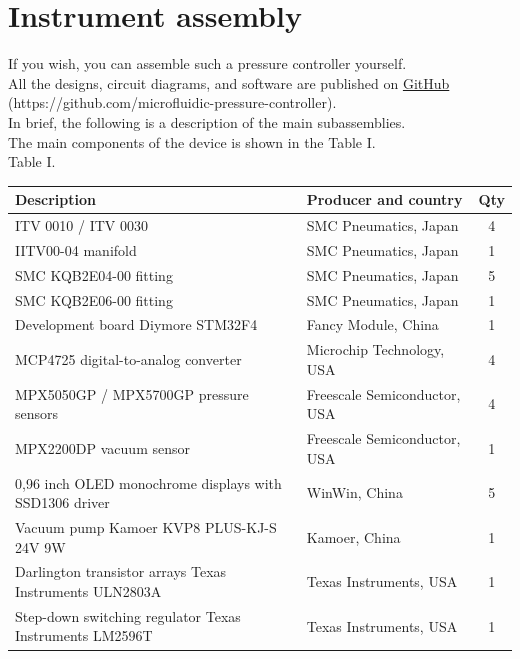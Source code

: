\documentclass[twoside, 12pt, a4paper]{refart}
\begin{document}
  \section{Instrument assembly}
    If you wish, you can assemble such a pressure controller yourself.\\
    All the designs, circuit diagrams, and software are published on  \href{https://github.com/microfluidic-pressure-controller}{GitHub} (https://github.com/microfluidic-pressure-controller).\\
    In brief, the following is a description of the main subassemblies.\\
    The main components of the device is shown in the Table I.\\
    Table I.\\
    \begin{tabular} { | p{6.5cm} | p{4.4cm} | p{0.7cm} | }
      \hline
      Description & Producer and country & Qty\\ \hline
      ITV 0010 / ITV 0030 & SMC Pneumatics, Japan & \multicolumn{1}{c|}{4} \\ \hline
      IITV00-04 manifold & SMC Pneumatics, Japan & \multicolumn{1}{c|}{1} \\ \hline
      SMC KQB2E04-00 fitting & SMC Pneumatics, Japan & \multicolumn{1}{c|}{5} \\ \hline      
      SMC KQB2E06-00 fitting & SMC Pneumatics, Japan & \multicolumn{1}{c|}{1} \\ \hline      
      Development board Diymore STM32F4  & Fancy Module, China & \multicolumn{1}{c|}{1} \\ \hline      
      MCP4725 digital-to-analog converter  & Microchip Technology, USA & \multicolumn{1}{c|}{4} \\ \hline      
      MPX5050GP / MPX5700GP pressure sensors & Freescale Semiconductor, USA & \multicolumn{1}{c|}{4} \\ \hline 
      MPX2200DP vacuum sensor  & Freescale Semiconductor, USA & \multicolumn{1}{c|}{1} \\ \hline  
      0,96 inch OLED monochrome displays with SSD1306 driver & WinWin, China & \multicolumn{1}{c|}{5} \\ \hline  
      Vacuum pump Kamoer KVP8 PLUS-KJ-S 24V 9W & Kamoer, China & \multicolumn{1}{c|}{1} \\ \hline  
      Darlington transistor arrays Texas Instruments ULN2803A  & Texas Instruments, USA & \multicolumn{1}{c|}{1} \\ \hline  
      Step-down switching regulator Texas Instruments LM2596T & Texas Instruments, USA & \multicolumn{1}{c|}{1} \\ \hline                                                 

\end{tabular}
\end{document}
